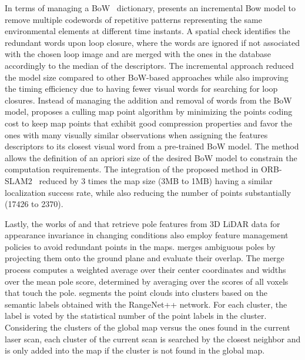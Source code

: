 In terms of managing a BoW~\parencite{discussion:bow} dictionary, \cite{tsintotas-et-al:2021:103782} presents an incremental Bow model to remove multiple codewords of repetitive patterns representing the same environmental elements at different time instants. A spatial check identifies the redundant words upon loop closure, where the words are ignored if not associated with the chosen loop image and are merged with the ones in the database accordingly to the median of the descriptors. The incremental approach reduced the model size compared to other BoW-based approaches while also improving the timing efficiency due to having fewer visual words for searching for loop closures.
Instead of managing the addition and removal of words from the BoW model, \cite{opdenbosch-et-al:2018:00114} proposes a culling map point algorithm by minimizing the points coding cost to keep map points that exhibit good compression properties and favor the ones with many visually similar observations when assigning the features descriptors to its closest visual word from a pre-trained BoW model. The method allows the definition of an apriori size of the desired BoW model to constrain the computation requirements. The integration of the proposed method in ORB-SLAM2~\parencite{discussion:orb-slam2} reduced by 3 times the map size (3MB to 1MB) having a similar localization success rate, while also reducing the number of points substantially (17426 to 2370). 

Lastly, the works of \cite{schaefer-et-al:2021:103709} and \cite{wang-et-al:2021:9739599} that retrieve pole features from 3D LiDAR data for appearance invariance in changing conditions also employ feature management policies to avoid redundant points in the maps.
\cite{schaefer-et-al:2021:103709} merges ambiguous poles by projecting them onto the ground plane and evaluate their overlap. The merge process computes a weighted average over their center coordinates and widths over the mean pole score, determined by averaging over the scores of all voxels that touch the pole.
\cite{wang-et-al:2021:9739599} segments the point clouds into clusters based on the semantic labels obtained with the RangeNet++ network. For each cluster, the label is voted by the statistical number of the point labels in the cluster. Considering the clusters of the global map versus the ones found in the current laser scan, each cluster of the current scan is searched by the closest neighbor and is only added into the map if the cluster is not found in the global map.





